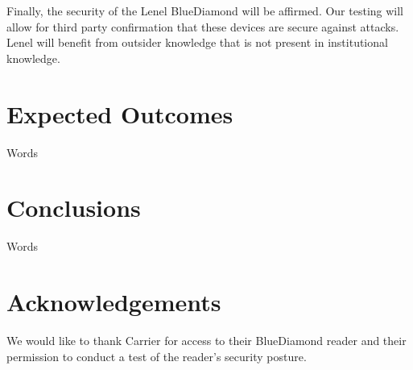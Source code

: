 \documentclass[10pt,twocolumn,letterpaper]{article}
\begin{document}
Finally, the security of the Lenel BlueDiamond will be affirmed. Our testing will allow for third party confirmation that these devices are secure against attacks. Lenel will benefit from outsider knowledge that is not present in institutional knowledge. 

\section{Expected Outcomes}
Words

\section{Conclusions}
Words

\section{Acknowledgements}
We would like to thank Carrier for access to their BlueDiamond reader and their permission to conduct a test of the reader's security posture.



\end{document}
